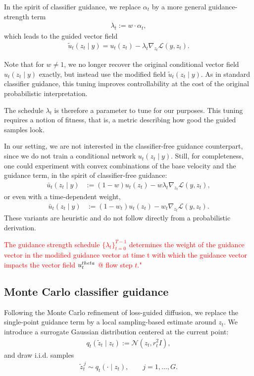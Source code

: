 \documentclass[a4paper,12pt]{article}
\begin{document}
In the spirit of classifier guidance, we replace $\alpha_t$ by a more general guidance-strength term
\begin{align*}
    \lambda_t := w \cdot \alpha_t,
\end{align*}
which leads to the guided vector field
\begin{align*}
    \tilde{u}_t(z_t \mid y) = u_t(z_t) - \lambda_t \nabla_{z_t}\mathcal{L}(y, z_t).
\end{align*}

Note that for $w \neq 1$, we no longer recover the original conditional vector field $u_t(z_t \mid y)$ exactly, but instead use the modified field $\tilde{u}_t(z_t \mid y)$.
As in standard classifier guidance, this tuning improves controllability at the cost of the original probabilistic interpretation.

The schedule $\lambda_t$ is therefore a parameter to tune for our purposes.
This tuning requires a notion of fitness, that is, a metric describing how good the guided samples look.

In our setting, we are not interested in the classifier-free guidance counterpart, since we do not train a conditional network $u_t(z_t \mid y)$.
Still, for completeness, one could experiment with convex combinations of the base velocity and the guidance term, in the spirit of classifier-free guidance:
\begin{align*}
    \bar{u}_t(z_t \mid y)
    &:= (1-w)u_t(z_t) - w \lambda_t \nabla_{z_t}\mathcal{L}(y, z_t),
\end{align*}
or even with a time-dependent weight,
\begin{align*}
    \bar{u}_t(z_t \mid y)
    &:= (1-w_t)u_t(z_t) - w_t \nabla_{z_t}\mathcal{L}(y, z_t).
\end{align*}
These variants are heuristic and do not follow directly from a probabilistic derivation.

\textcolor{red}{The guidance strength schedule \(\{\lambda_t\}_{t=0}^{T-1}\) determines the weight of the guidance vector in the modified guidance vector at time t with which the guidance vector impacts the vector field \(u_t^{\\theta}\) @ flow step \(t\)."}

\subsection{Monte Carlo classifier guidance}

Following the Monte Carlo refinement of loss-guided diffusion, we replace the single-point guidance term by a local sampling-based estimate around $z_t$.
We introduce a surrogate Gaussian distribution centered at the current point:
\begin{align*}
q_t(\tilde{z}_t \mid z_t) := \mathcal{N}(z_t, r_t^2 I),
\end{align*}
and draw i.i.d. samples
\begin{align*}
\tilde{z}_t^{\,j} \sim q_t(\cdot \mid z_t), \qquad j=1,\dots,G.
\end{align*}
\end{document}
